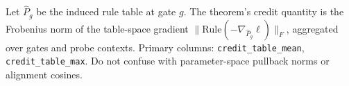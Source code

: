 
Let $\widehat P_g$ be the induced rule table at gate $g$. The theorem's credit
quantity is the Frobenius norm of the table-space gradient
$\|\mathrm{Rule}(-\nabla_{\widehat P_g}\ell)\|_F$, aggregated over gates and
probe contexts. Primary columns: \texttt{credit\_table\_mean}, \texttt{credit\_table\_max}.
Do not confuse with parameter-space pullback norms or alignment cosines.

